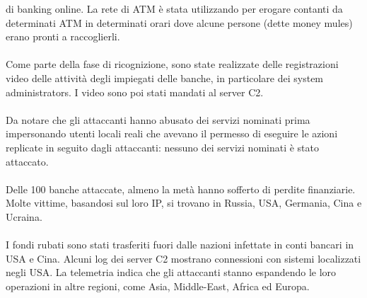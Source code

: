 \documentclass[8pt]{extarticle}
\begin{document}
di banking online. La rete di ATM è stata utilizzando per erogare contanti da determinati ATM in 
determinati orari dove alcune persone (dette money mules) erano pronti a raccoglierli.\\\\
Come parte della fase di ricognizione, sono state realizzate delle registrazioni video delle attività 
degli impiegati delle banche, in particolare dei system administrators. I video sono poi stati mandati 
al server C2.\\\\
Da notare che gli attaccanti hanno abusato dei servizi nominati prima impersonando utenti locali reali 
che avevano il permesso di eseguire le azioni replicate in seguito dagli attaccanti: nessuno dei 
servizi nominati è stato attaccato.\\\\
Delle 100 banche attaccate, almeno la metà hanno sofferto di perdite finanziarie. Molte vittime, 
basandosi sul loro IP, si trovano in Russia, USA, Germania, Cina e Ucraina.\\\\
I fondi rubati sono stati trasferiti fuori dalle nazioni infettate in conti bancari in USA e Cina. 
Alcuni log dei server C2 mostrano connessioni con sistemi localizzati negli USA. La telemetria 
indica che gli attaccanti stanno espandendo le loro operazioni in altre regioni, come Asia, 
Middle-East, Africa ed Europa. 
\end{document}
